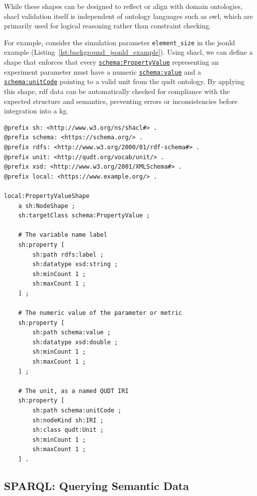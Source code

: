 While these shapes can be designed to reflect or align with domain ontologies, \gls{shacl} validation itself is independent of ontology languages such as \gls{owl}, which are primarily used for logical reasoning rather than constraint checking.

For example, consider the simulation parameter \texttt{element\_size} in the \gls{jsonld} example (Listing~\ref{lst:background_jsonld_example}). Using \gls{shacl}, we can define a shape that enforces that every \href{https://schema.org/PropertyValue}{\texttt{schema:PropertyValue}} representing an experiment parameter must have a numeric \href{https://schema.org/value}{\texttt{schema:value}} and a \href{https://schema.org/unitCode}{\texttt{schema:unitCode}} pointing to a valid unit from the \gls{qudt} ontology. By applying this shape, \gls{rdf} data can be automatically checked for compliance with the expected structure and semantics, preventing errors or inconsistencies before integration into a \gls{kg}.

\begin{lstlisting}[float=htbp,style=turtle, caption={SHACL shape for validating simulation parameters}, label={lst:background_shacl_example}]
@prefix sh: <http://www.w3.org/ns/shacl#> .
@prefix schema: <https://schema.org/> .
@prefix rdfs: <http://www.w3.org/2000/01/rdf-schema#> .
@prefix unit: <http://qudt.org/vocab/unit/> .
@prefix xsd: <http://www.w3.org/2001/XMLSchema#> .
@prefix local: <https://www.example.org/> .

local:PropertyValueShape
    a sh:NodeShape ;
    sh:targetClass schema:PropertyValue ;

    # The variable name label
    sh:property [
        sh:path rdfs:label ;
        sh:datatype xsd:string ;
        sh:minCount 1 ;
        sh:maxCount 1 ;
    ] ;

    # The numeric value of the parameter or metric
    sh:property [
        sh:path schema:value ;
        sh:datatype xsd:double ;
        sh:minCount 1 ;
        sh:maxCount 1 ;
    ] ;

    # The unit, as a named QUDT IRI
    sh:property [
        sh:path schema:unitCode ;
        sh:nodeKind sh:IRI ;
        sh:class qudt:Unit ;
        sh:minCount 1 ;
        sh:maxCount 1 ;
    ] .
\end{lstlisting}

\subsection{SPARQL: Querying Semantic Data}
\label{sec:background:sparql}


